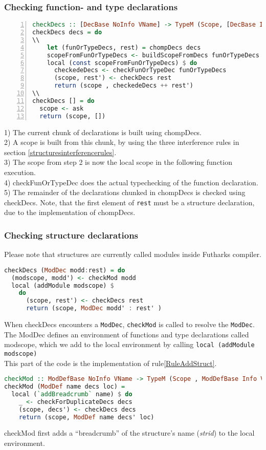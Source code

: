\subsubsection{Checking function- and type declarations \label{subsec:checkfunortype}}
\begin{lstlisting}[language=Haskell, numbers=left]
checkDecs :: [DecBase NoInfo VName] -> TypeM (Scope, [DecBase Info VName])
checkDecs decs = do
\\
    let (funOrTypeDecs, rest) = chompDecs decs
    scopeFromFunOrTypeDecs <- buildScopeFromDecs funOrTypeDecs
    local (const scopeFromFunOrTypeDecs) $ do
      checkedeDecs <- checkFunOrTypeDec funOrTypeDecs
      (scope, rest') <- checkDecs rest
      return (scope , checkedeDecs ++ rest')
\\
checkDecs [] = do
  scope <- ask
  return (scope, [])
\end{lstlisting}
1) The current chunk of declarations is built using chompDecs. \\
2) A scope is built from this chunk, by using the three interference rules in
section \ref{structuresinterferencerules}.\\
3) The scope from step 2 is now the local scope in the following function
execution.\\
4) checkFunOrTypeDec does the actual typechecking of the function declaration. \\
5) The remainder of the declarations chunked in chompDecs is checked using
checkDecs. Note, that the first element of \texttt{rest} must be a structure
declaration, due to the implementation of chompDecs.\\
\subsubsection{Checking structure declarations\label{checkingstructuredeclarations}}
Please note that structures are currently called modules inside Futharks compiler.
\begin{lstlisting}[language=Haskell]
checkDecs (ModDec modd:rest) = do
  (modscope, modd') <- checkMod modd
  local (addModule modscope) $
    do
      (scope, rest') <- checkDecs rest
      return (scope, ModDec modd' : rest' )
\end{lstlisting}
When checkDecs encounters a \texttt{ModDec}, \texttt{checkMod} is called to resolve the \texttt{ModDec}.
The ModDec defines an environment of functions and type declarations called
modscope, which we add to the local environment by calling \texttt{local
  (addModule modscope)}\\
This part of the code is the implementation of rule\ref{RuleAddStruct}.
\begin{lstlisting}[language=Haskell]
checkMod :: ModDefBase NoInfo VName -> TypeM (Scope , ModDefBase Info VName)
checkMod (ModDef name decs loc) =
  local (`addBreadcrumb` name) $ do
    _ <- checkForDuplicateDecs decs
    (scope, decs') <- checkDecs decs
    return (scope, ModDef name decs' loc)
\end{lstlisting}
checkMod first adds a ``breadcrumb'' of the structure's name (\textit{strid}) to
the local environment. 

